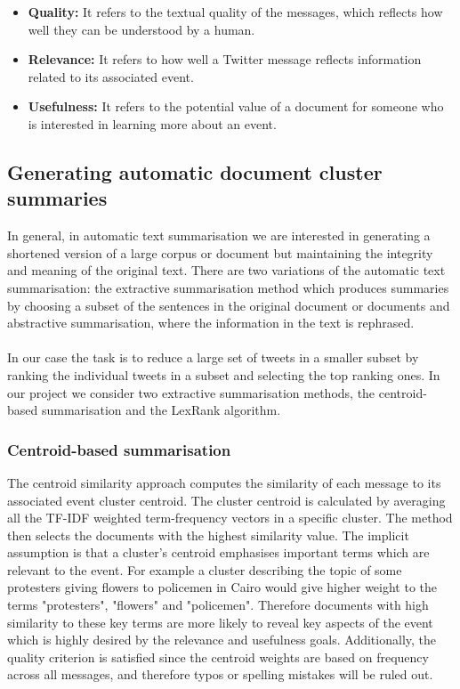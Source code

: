 \begin{itemize}
 \item \textbf{Quality:} It refers to the textual quality of the messages, which reflects how well they can be understood by a human.
 \item \textbf{Relevance:} It refers to how well a Twitter message reflects information related to its associated event.
 \item \textbf{Usefulness:} It refers to the potential value of a document for someone who is interested in learning more about an event.
\end{itemize}\vspace{15pt}

\subsection{Generating automatic document cluster summaries}
In general, in automatic text summarisation we are interested in generating a shortened version of a large corpus or document but maintaining the integrity and meaning of 
the original text. There are two variations of the automatic text summarisation: the extractive summarisation method which produces summaries by choosing a subset of the sentences
in the original document or documents and abstractive summarisation, where the information in the text is rephrased.\\\\
In our case the task is to reduce a large set of tweets in a smaller subset by ranking the individual tweets in a subset and selecting the top ranking ones.
In our project we consider two extractive summarisation methods, the centroid-based summarisation and the LexRank algorithm.

\subsubsection{Centroid-based summarisation}
The centroid similarity approach computes the similarity of each message to its associated event cluster centroid. The cluster centroid is calculated by averaging all the TF-IDF weighted term-frequency vectors in a specific cluster. The method then selects the documents with the highest similarity value. The implicit assumption is that a cluster's centroid emphasises important terms which are relevant to the event. For example a cluster describing the topic of some protesters giving flowers to policemen in Cairo would give higher weight to the terms "protesters", "flowers" and "policemen". Therefore documents with high similarity to these key terms are more likely to reveal key aspects of the event which is highly desired by the relevance and usefulness goals. Additionally, the quality criterion is satisfied since the centroid weights are based on frequency across all messages, and therefore typos or spelling mistakes will be ruled out. 

